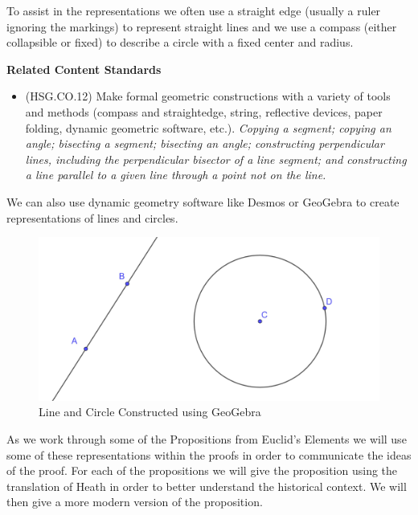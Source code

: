 \documentclass[
]{book}
\providecommand{\tightlist}{%
  \setlength{\itemsep}{0pt}\setlength{\parskip}{0pt}}
\newenvironment{standards}{}{}
\theoremstyle{definition}
\theoremstyle{definition}
\theoremstyle{definition}
\theoremstyle{definition}
\theoremstyle{remark}
\begin{document}
To assist in the representations we often use a straight edge (usually a ruler ignoring the markings) to represent straight lines and we use a compass (either collapsible or fixed) to describe a circle with a fixed center and radius.

\begin{standards}

\begin{center}
\textbf{Related Content Standards}

\end{center}

\begin{itemize}
\tightlist
\item
  (HSG.CO.12) Make formal geometric constructions with a variety of tools and methods (compass and straightedge, string, reflective devices, paper folding, dynamic geometric software, etc.). \emph{Copying a segment; copying an angle; bisecting a segment; bisecting an angle; constructing perpendicular lines, including the perpendicular bisector of a line segment; and constructing a line parallel to a given line through a point not on the line.}
\end{itemize}

\end{standards}

We can also use dynamic geometry software like Desmos or GeoGebra to create representations of lines and circles.

\begin{figure}

{\centering \includegraphics[width=0.6\linewidth]{images/circle-line} 

}

\caption{Line and Circle Constructed using GeoGebra}\label{fig:Straightedge-Compass2}
\end{figure}

As we work through some of the Propositions from Euclid's Elements we will use some of these representations within the proofs in order to communicate the ideas of the proof. For each of the propositions we will give the proposition using the translation of Heath \citep{Heath1908_1} in order to better understand the historical context. We will then give a more modern version of the proposition.
\end{document}
